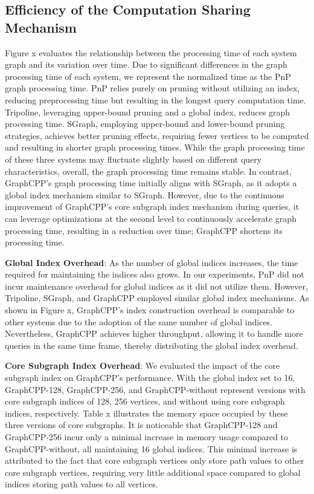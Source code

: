 \documentclass[lettersize,journal]{IEEEtran} %
\begin{document}
\subsection{Efficiency of the Computation Sharing Mechanism}
Figure x evaluates the relationship between the processing time of each system graph and its variation over time. Due to significant differences in the graph processing time of each system, we represent the normalized time as the PnP graph processing time. PnP relies purely on pruning without utilizing an index, reducing preprocessing time but resulting in the longest query computation time. Tripoline, leveraging upper-bound pruning and a global index, reduces graph processing time. SGraph, employing upper-bound and lower-bound pruning strategies, achieves better pruning effects, requiring fewer vertices to be computed and resulting in shorter graph processing times. While the graph processing time of these three systems may fluctuate slightly based on different query characteristics, overall, the graph processing time remains stable. In contrast, GraphCPP's graph processing time initially aligns with SGraph, as it adopts a global index mechanism similar to SGraph. However, due to the continuous improvement of GraphCPP's core subgraph index mechanism during queries, it can leverage optimizations at the second level to continuously accelerate graph processing time, resulting in a reduction over time; GraphCPP shortens its processing time.

{\bf{Global Index Overhead}}: As the number of global indices increases, the time required for maintaining the indices also grows. In our experiments, PnP did not incur maintenance overhead for global indices as it did not utilize them. However, Tripoline, SGraph, and GraphCPP employed similar global index mechanisms. As shown in Figure x, GraphCPP's index construction overhead is comparable to other systems due to the adoption of the same number of global indices. Nevertheless, GraphCPP achieves higher throughput, allowing it to handle more queries in the same time frame, thereby distributing the global index overhead.

{\bf{Core Subgraph Index Overhead}}: We evaluated the impact of the core subgraph index on GraphCPP's performance. With the global index set to 16, GraphCPP-128, GraphCPP-256, and GraphCPP-without represent versions with core subgraph indices of 128, 256 vertices, and without using core subgraph indices, respectively. Table x illustrates the memory space occupied by these three versions of core subgraphs. It is noticeable that GraphCPP-128 and GraphCPP-256 incur only a minimal increase in memory usage compared to GraphCPP-without, all maintaining 16 global indices. This minimal increase is attributed to the fact that core subgraph vertices only store path values to other core subgraph vertices, requiring very little additional space compared to global indices storing path values to all vertices.
\end{document}
